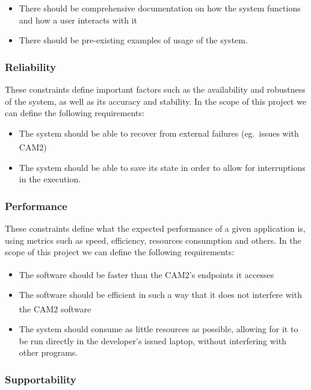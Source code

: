 \begin{itemize}
	\item There should be comprehensive documentation on how the system functions and how a user interacts with it
	\item There should be pre-existing examples of usage of the system.
\end{itemize}

\subsubsection{Reliability}

These constraints define important factors such as the availability and robustness of the system, as well as its accuracy and stability. In the scope of this project we can define the following requirements:

\begin{itemize}
	\item The system should be able to recover from external failures (eg.\ issues with CAM2\textsuperscript{\textregistered})
	\item The system should be able to save its state in order to allow for interruptions in the execution.
\end{itemize}

\subsubsection{Performance}

These constraints define what the expected performance of a given application is, using metrics such as speed, efficiency, resources consumption and others. In the scope of this project we can define the following requirements:

\begin{itemize}
	\item The software should be faster than the CAM2\textsuperscript{\textregistered}'s endpoints it accesses
	\item The software should be efficient in such a way that it does not interfere with the CAM2\textsuperscript{\textregistered} software
	\item The system should consume as little resources as possible, allowing for it to be run directly in the developer's issued laptop, without interfering with other programs.
\end{itemize}

\subsubsection{Supportability}

